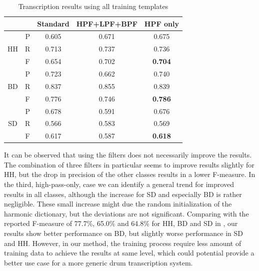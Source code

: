 \documentclass{article}
\begin{document}
\begin{table}[h]
\begin{center}
\begin{tabular}{|c|c|c|c|c|}
\hline
\multicolumn{2}{|c|}{}  & Standard & HPF+LPF+BPF & HPF only \\ \hline
\multirow{3}{*}{HH} & P & 0.605    & 0.671       & 0.675    \\ \cline{2-5} 
                    & R & 0.713    & 0.737       & 0.736    \\ \cline{2-5} 
                    & F & 0.654    & 0.702       & \textbf{0.704}    \\ \hline
\multirow{3}{*}{BD} & P & 0.723    & 0.662       & 0.740    \\ \cline{2-5} 
                    & R & 0.837    & 0.855       & 0.839    \\ \cline{2-5} 
                    & F & 0.776    & 0.746       & \textbf{0.786}    \\ \hline
\multirow{3}{*}{SD} & P & 0.678    & 0.591       & 0.676    \\ \cline{2-5} 
                    & R & 0.566    & 0.583       & 0.569    \\ \cline{2-5} 
                    & F & 0.617    & 0.587       & \textbf{0.618}    \\ \hline
\end{tabular}
\end{center}
 \caption{Transcription results using all training templates} %
 \label{tab:basicResults}
\end{table}

It can be observed that using the filters does not necessarily improve the results. The combination of three filters in particular seems to improve results slightly for HH, but the drop in precision of the other classes results in a lower F-measure. In the third, high-pass-only, case we can identify a general trend for improved results in all classes, although the increase for SD and especially BD is rather negligible. These small increase might due the random initialization of the harmonic dictionary, but the deviations are not significant.   
Comparing with the reported F-measure of 77.7\%, 65.0\% and 64.8\% for HH, BD and SD in \cite{Gillet2008}, our results show better performance on BD, but slightly worse performance in SD and HH. However, in our method, the training process require less amount of training data to achieve the results at same level, which could potential provide a better use case for a more generic drum transcription system.     
\end{document}
